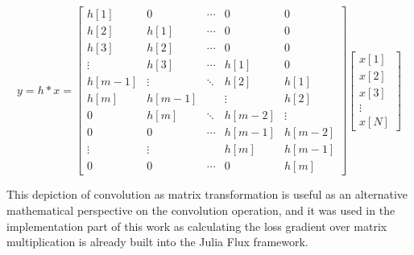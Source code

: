\begin{equation}
    y = h \ast x = 
    \begin{bmatrix}
        h[1] & 0 & \cdots & 0 & 0 \\
        h[2] & h[1] & \cdots & 0 & 0 \\
        h[3] & h[2] & \cdots & 0 & 0 \\
        \vdots & h[3] & \cdots & h[1] & 0 \\
        h[m-1] & \vdots & \ddots & h[2] & h[1] \\
        h[m] & h[m-1] &    & \vdots & h[2] \\
        0 & h[m] & \ddots & h[m-2] & \vdots \\
        0 & 0 & \cdots & h[m-1] & h[m-2] \\
        \vdots & \vdots &    & h[m] & h[m-1] \\
        0 & 0 & \cdots & 0 & h[m] 
    \end{bmatrix}
    \begin{bmatrix}
        x[1] \\
        x[2] \\
        x[3] \\
        \vdots \\
        x[N]
    \end{bmatrix}
    \label{eq:conv_matrix}
\end{equation}

This depiction of convolution as matrix transformation is useful as an alternative mathematical perspective on the convolution operation, and it 
was used in the implementation part of this work as calculating the loss gradient over matrix multiplication is already built into the Julia Flux
framework.

